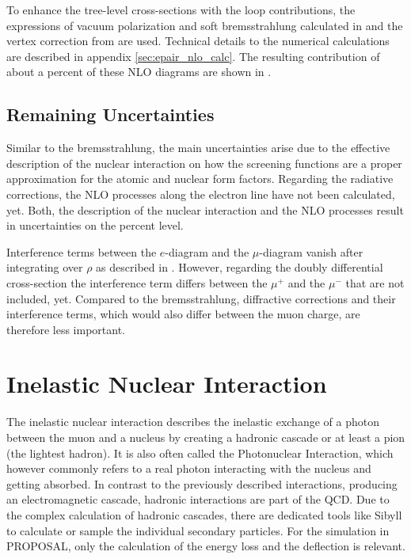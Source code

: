To enhance the tree-level cross-sections with the loop contributions, the expressions of vacuum polarization and soft bremsstrahlung calculated in \cite{Mork65} and the vertex correction from \cite{Akhiezer81} are used.
Technical details to the numerical calculations are described in appendix \ref{sec:epair_nlo_calc}.
The resulting contribution of about a percent of these NLO diagrams are shown in .

\subsection{Remaining Uncertainties}

Similar to the bremsstrahlung, the main uncertainties arise due to the effective description of the nuclear interaction on how the screening functions are a proper approximation for the atomic and nuclear form factors.
Regarding the radiative corrections, the NLO processes along the electron line have not been calculated, yet.
Both, the description of the nuclear interaction and the NLO processes result in uncertainties on the percent level. \cite{Sandrock20ICPPA}

Interference terms between the $e$-diagram and the $\mu$-diagram vanish after integrating over $\rho$ as described in \cite{Kelner67}.
However, regarding the doubly differential cross-section the interference term differs between the $\mu^+$ and the $\mu^-$ that are not included, yet.
Compared to the bremsstrahlung, diffractive corrections and their interference terms, which would also differ between the muon charge, are therefore less important.

%
% 
%
%

\section{Inelastic Nuclear Interaction} \label{sec:photonucl}

The inelastic nuclear interaction describes the inelastic exchange of a photon between the muon and a nucleus by creating a hadronic cascade or at least a pion (the lightest hadron).
It is also often called the Photonuclear Interaction, which however commonly refers to a real photon interacting with the nucleus and getting absorbed.
In contrast to the previously described interactions, producing an electromagnetic cascade, hadronic interactions are part of the QCD.
Due to the complex calculation of hadronic cascades, there are dedicated tools like Sibyll \cite{Riehn20Sibyll} to calculate or sample the individual secondary particles.
For the simulation in PROPOSAL, only the calculation of the energy loss and the deflection is relevant.

